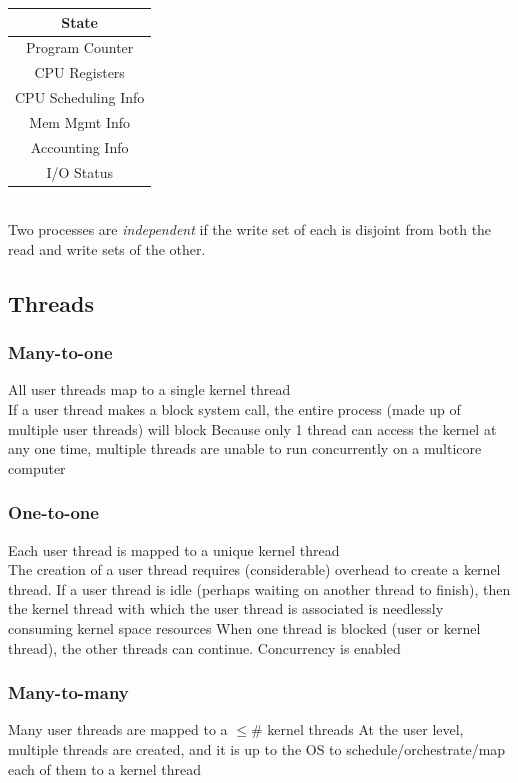 \documentclass[a4paper]{article}
\begin{document}
\begin{multicols*}{2}
    \begin{tabular}{|c|}
        \hline
        State               \\
        \hline
        Program Counter     \\
        \hline
        CPU Registers       \\
        \hline
        CPU Scheduling Info \\
        \hline
        Mem Mgmt Info       \\
        \hline
        Accounting Info     \\
        \hline
        I/O Status          \\
        \hline
    \end{tabular}
    \\
    Two processes are \emph{independent} if the write set of each is disjoint
    from both the read and write sets of the other.
    \subsection*{Threads}
    \subsubsection*{Many-to-one} All user threads map to a single kernel thread \\
    If a user thread makes a block system call, the entire process (made up of
    multiple user threads) will block Because only 1 thread can access the
    kernel at any one time, multiple threads are unable to run concurrently on a
    multicore computer

    \subsubsection*{One-to-one} Each user thread is mapped to a unique kernel thread \\
    The creation of a user thread requires (considerable) overhead to create a
    kernel thread. If a user thread is idle (perhaps waiting on another thread
    to finish), then the kernel thread with which the user thread is associated
    is needlessly consuming kernel space resources When one thread is blocked
    (user or kernel thread), the other threads can continue. Concurrency is
    enabled

    \subsubsection*{Many-to-many} Many user threads are mapped to a \(\leq \#\)
    kernel threads At the user level, multiple threads are created, and it is up
    to the OS to schedule/orchestrate/map each of them to a kernel thread


\end{multicols*}
\end{document}
